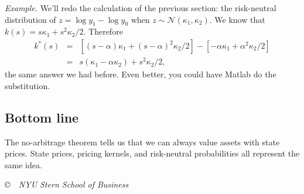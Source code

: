 \documentclass[11pt]{article}
\begin{document}
{\it Example.\/}
We'll redo the calculation of the previous section:
the risk-neutral distribution of $z = \log y_1 - \log y_0$
when $z \sim \mathcal{N}(\kappa_1,\kappa_2)$.
We know that $k(s) = s \kappa_1 + s^2 \kappa_2/2$.
Therefore
\begin{eqnarray*}
    k^*(s) &=& [(s-\alpha) \kappa_1 + (s-\alpha)^2 \kappa_2/2]
            - [-\alpha \kappa_1 + \alpha^2 \kappa_2/2]  \\
           &=& s(\kappa_1 - \alpha \kappa_2) + s^2 \kappa_2/2 ,
\end{eqnarray*}
the same answer we had before.
Even better, you could have Matlab do the substitution.



\subsection*{Bottom line}

The no-arbitrage theorem tells us that we can always value assets with state prices.
State prices, pricing kernels, and risk-neutral probabilities all represent
the same idea.



\vfill \centerline{\it \copyright \ \number\year \
NYU Stern School of Business}
\end{document}
